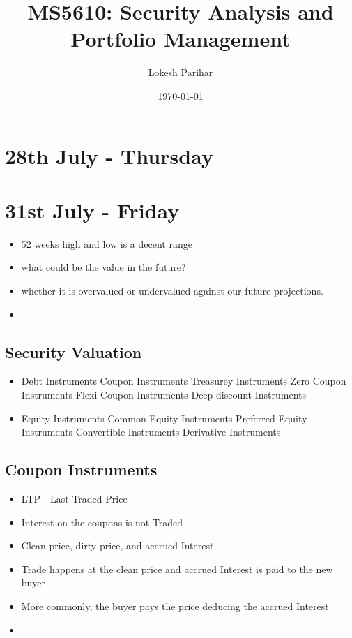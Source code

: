 \documentclass{article}
\title{MS5610: Security Analysis and Portfolio Management}
\author{Lokesh Parihar}
\date{\today}
\begin{document}
\titlepage 
\newpage
\tableofcontents
\newpage

\section{28th July - Thursday}



\section{31st July - Friday}
\begin{itemize}
    \item 52 weeks high and low is a decent range
    \item what could be the value in the future?
    \item whether it is overvalued or undervalued against our future projections.
    \item 
\end{itemize}


\subsection{Security Valuation}
\begin{itemize}
    \item Debt Instruments
    \subitem Coupon Instruments
    \subitem Treasurey Instruments
    \subitem Zero Coupon Instruments
    \subitem Flexi Coupon Instruments
    \subitem Deep discount Instruments
    \item Equity Instruments
    \subitem Common Equity Instruments
    \subitem Preferred Equity Instruments
    \subitem Convertible Instruments
    \subitem Derivative Instruments

\end{itemize}

\subsection{Coupon Instruments}
\begin{itemize}
    \item LTP - Last Traded Price
    \item Interest on the coupons is not Traded
    \item Clean price, dirty price, and accrued Interest
    \item Trade happens at the clean price and accrued Interest is paid to the new buyer
    \item More commonly, the buyer pays the price deducing the accrued Interest
    \item 
\end{itemize}
\end{document}
